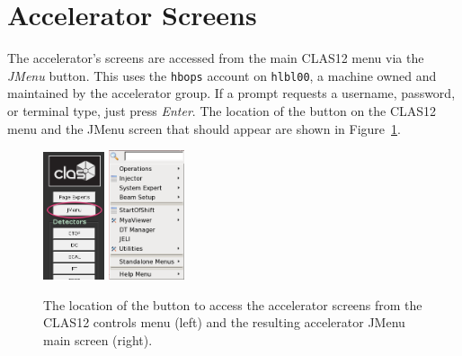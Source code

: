 \documentclass[amsmath,amssymb,notitlepage,11pt]{revtex4}
\begin{document}
\newpage
\section{Accelerator Screens}
The accelerator's screens are accessed from the main CLAS12 menu via the {\em JMenu} button.  This uses the \texttt{hbops} account on \texttt{hlbl00}, a machine owned and maintained by the accelerator group.  If a prompt requests a username, password, or terminal type, just press {\em Enter}.  The location of the button on the CLAS12 menu and the JMenu screen that should appear are shown in Figure~\ref{fig:jmenu}.
\begin{figure}[htbp]\centering
  \includegraphics[width=0.16\textwidth]{pics/clas12jmenu}
  \includegraphics[width=0.2\textwidth]{pics/jmenu}
  \caption{The location of the button to access the accelerator screens from the CLAS12 controls menu (left) and the resulting accelerator JMenu main screen (right).\label{fig:jmenu}}
\end{figure}
\newpage
\end{document}
